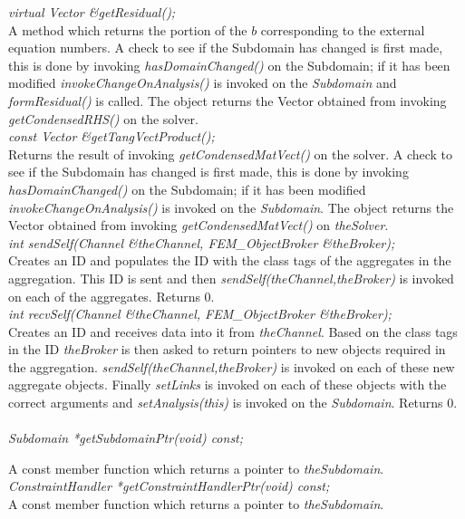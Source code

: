 {\em virtual Vector \&getResidual();}\\
A method which returns the portion of the $b$ corresponding
to the external equation numbers. A check to see if the Subdomain has changed is first made, 
this is done by invoking {\em hasDomainChanged()} on the Subdomain; if it has 
been modified {\em invokeChangeOnAnalysis()} is invoked on the {\em Subdomain}
and {\em formResidual()} is called.  The object returns the Vector obtained from 
invoking {\em getCondensedRHS()} on the solver. \\ 


{\em const Vector \&getTangVectProduct();}\\
Returns the result of invoking {\em getCondensedMatVect()} on the
solver. A check to see if the Subdomain has changed is first made, 
this is done by invoking {\em hasDomainChanged()} on the Subdomain; if it has 
been modified {\em invokeChangeOnAnalysis()} is invoked on the {\em Subdomain}. 
The object returns the Vector obtained from invoking {\em getCondensedMatVect()} 
on {\em theSolver}. \\


{\em int sendSelf(Channel \&theChannel, FEM\_ObjectBroker \&theBroker);}\\
Creates an ID and populates the ID with the class tags of the aggregates in
the aggregation. This ID is sent and then {\em sendSelf(theChannel,theBroker)} is
invoked on each of the aggregates. Returns 0.\\

{\em int recvSelf(Channel \&theChannel, FEM\_ObjectBroker \&theBroker);}\\
Creates an ID and receives data into it from {\em theChannel}. Based on the
class tags in the ID {\em theBroker} is then asked to return pointers to
new objects required in the aggregation.  {\em sendSelf(theChannel,theBroker)} is
invoked on each of these new aggregate objects. Finally {\em setLinks} is
invoked on each of these objects with the correct arguments and {\em setAnalysis(this)} 
is invoked on the {\em Subdomain}.  Returns 0.\\


  \\
{\em Subdomain  *getSubdomainPtr(void) const;} 

A const member function which returns a pointer to {\em theSubdomain}. \\

{\em ConstraintHandler *getConstraintHandlerPtr(void) const;}\\
A const member function which returns a pointer to {\em theSubdomain}.\\

